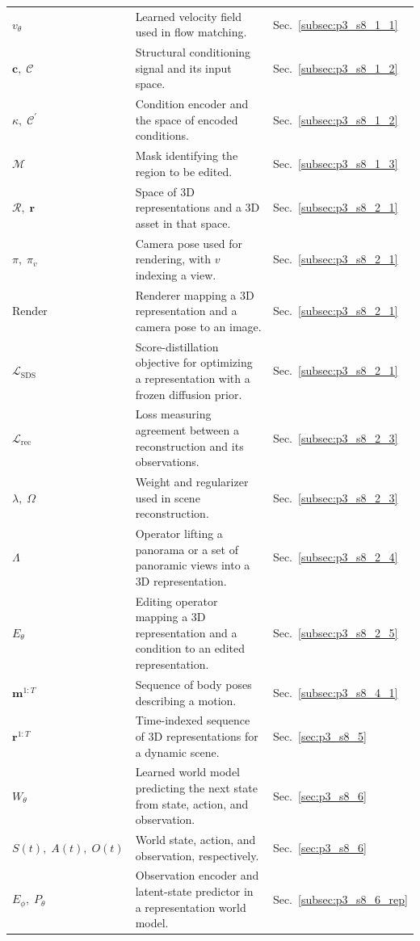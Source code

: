 \begin{longtable}{lll}
$v_\theta$ & Learned velocity field used in flow matching. & Sec.~\ref{subsec:p3_s8_1_1} \\
$\mathbf{c},\;\mathcal{C}$ & Structural conditioning signal and its input space. & Sec.~\ref{subsec:p3_s8_1_2} \\
$\kappa,\;\mathcal{C}^{\prime}$ & Condition encoder and the space of encoded conditions. & Sec.~\ref{subsec:p3_s8_1_2} \\
$\mathcal{M}$ & Mask identifying the region to be edited. & Sec.~\ref{subsec:p3_s8_1_3} \\
$\mathcal{R},\;\mathbf{r}$ & Space of 3D representations and a 3D asset in that space. & Sec.~\ref{subsec:p3_s8_2_1} \\
$\pi,\;\pi_v$ & Camera pose used for rendering, with $v$ indexing a view. & Sec.~\ref{subsec:p3_s8_2_1} \\
$\mathrm{Render}$ & Renderer mapping a 3D representation and a camera pose to an image. & Sec.~\ref{subsec:p3_s8_2_1} \\
$\mathcal{L}_{\mathrm{SDS}}$ & Score-distillation objective for optimizing a representation with a frozen diffusion prior. & Sec.~\ref{subsec:p3_s8_2_1} \\
$\mathcal{L}_{\mathrm{rec}}$ & Loss measuring agreement between a reconstruction and its observations. & Sec.~\ref{subsec:p3_s8_2_3} \\
$\lambda,\;\Omega$ & Weight and regularizer used in scene reconstruction. & Sec.~\ref{subsec:p3_s8_2_3} \\
$\Lambda$ & Operator lifting a panorama or a set of panoramic views into a 3D representation. & Sec.~\ref{subsec:p3_s8_2_4} \\
$E_\theta$ & Editing operator mapping a 3D representation and a condition to an edited representation. & Sec.~\ref{subsec:p3_s8_2_5} \\
$\mathbf{m}^{1:T}$ & Sequence of body poses describing a motion. & Sec.~\ref{subsec:p3_s8_4_1} \\
$\mathbf{r}^{1:T}$ & Time-indexed sequence of 3D representations for a dynamic scene. & Sec.~\ref{sec:p3_s8_5} \\
$W_\theta$ & Learned world model predicting the next state from state, action, and observation. & Sec.~\ref{sec:p3_s8_6} \\
$S(t),\;A(t),\;O(t)$ & World state, action, and observation, respectively. & Sec.~\ref{sec:p3_s8_6} \\
$E_\phi,\;P_\theta$ & Observation encoder and latent-state predictor in a representation world model. & Sec.~\ref{subsec:p3_s8_6_rep} \\

\end{longtable}
